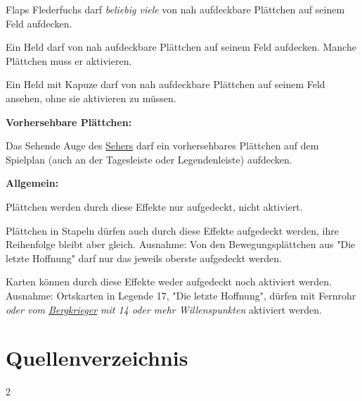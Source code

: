 \documentclass[10pt, a4paper, oneside]{book}
\newcommand{\fan}[1]{\textit{#1}}
\begin{document}
\bullet{} Flaps Flederfuchs darf \fan{beliebig viele} von nah aufdeckbare Plättchen auf seinem Feld aufdecken.
\supercite{dek-begleitheft,dfl-begleitheft}

\bullet{} Ein Held darf von nah aufdeckbare Plättchen auf seinem Feld aufdecken. Manche Plättchen muss er aktivieren.

\bullet{} Ein Held mit Kapuze darf von nah aufdeckbare Plättchen auf seinem Feld ansehen, ohne sie aktivieren zu müssen.
\supercite{dlh-ausruestungstafel}
\bigskip


\textbf{Vorhersehbare Plättchen:}

\bullet{} Das Sehende Auge des \hyperref[seher]{Sehers} darf ein vorhersehbares Plättchen auf dem Spielplan (auch an der Tagesleiste oder Legendenleiste) aufdecken.
\bigskip


\textbf{Allgemein:}

\bullet{} Plättchen werden durch diese Effekte nur aufgedeckt, nicht aktiviert.

\bullet{} Plättchen in Stapeln dürfen auch durch diese Effekte aufgedeckt werden, ihre Reihenfolge bleibt aber gleich.
\supercite{bl-bdm-a3-en}
Ausnahme: Von den Bewegungsplättchen aus "Die letzte Hoffnung" darf nur das jeweils oberste aufgedeckt werden.
\supercite{dh-begleitheft}

\bullet{} Karten können durch diese Effekte weder aufgedeckt noch aktiviert werden. Ausnahme: Ortskarten in Legende 17, "Die letzte Hoffnung", dürfen mit Fernrohr \fan{oder vom \hyperref[bergkrieger]{Bergkrieger} mit 14 oder mehr Willenspunkten} aktiviert werden.
\bigskip






\newpage
\chapter{Quellenverzeichnis}
\label{quellen}

\begin{multicols*}{2}\raggedcolumns
    \setlength\bibitemsep{1pt}
    \renewcommand*{\bibfont}{\fontsize{6}{6}\selectfont}
    \printbibliography[heading=none]
\end{multicols*}












\newpage
\end{document}
